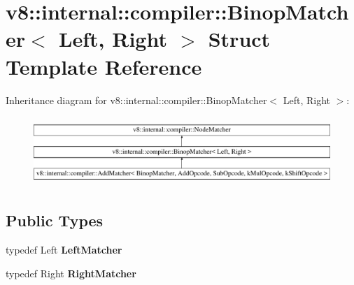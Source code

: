 \hypertarget{structv8_1_1internal_1_1compiler_1_1BinopMatcher}{}\section{v8\+:\+:internal\+:\+:compiler\+:\+:Binop\+Matcher$<$ Left, Right $>$ Struct Template Reference}
\label{structv8_1_1internal_1_1compiler_1_1BinopMatcher}
Inheritance diagram for v8\+:\+:internal\+:\+:compiler\+:\+:Binop\+Matcher$<$ Left, Right $>$\+:\begin{figure}[H]
\begin{center}
\leavevmode
\includegraphics[height=2.649842cm]{structv8_1_1internal_1_1compiler_1_1BinopMatcher}
\end{center}
\end{figure}
\subsection*{Public Types}
\begin{DoxyCompactItemize}
\item 
\mbox{\label{structv8_1_1internal_1_1compiler_1_1BinopMatcher_add15be1cbb9d86c593ca83b8a90471df}} 
typedef Left {\bfseries Left\+Matcher}
\item 
\mbox{\label{structv8_1_1internal_1_1compiler_1_1BinopMatcher_a00090d100f19cb85a335326658159523}} 
typedef Right {\bfseries Right\+Matcher}
\end{DoxyCompactItemize}
